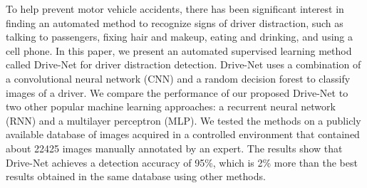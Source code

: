 To help prevent motor vehicle accidents, there has been significant interest in finding an automated method to recognize signs of driver distraction, such as talking to passengers, fixing hair and makeup, eating and drinking, and using a cell phone. In this paper, we present an automated supervised learning method called Drive-Net for driver distraction detection. Drive-Net uses a combination of a convolutional neural network (CNN) and a random decision forest to classify images of a driver. We compare the performance of our proposed Drive-Net to two other popular machine learning approaches: a recurrent neural network (RNN) and a multilayer perceptron (MLP). We tested the methods on a publicly available database of images acquired in a controlled environment that contained about 22425 images manually annotated by an expert. The results show that Drive-Net achieves a detection accuracy of 95\%, which is 2\% more than the best results obtained in the same database using other methods.
